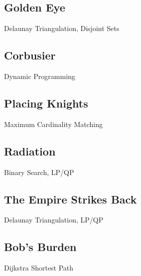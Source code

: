 \documentclass[10pt,a4paper,twoside]{report}
\begin{document}
\newpage
\subsection*{Golden Eye}
\begin{keywords}Delaunay Triangulation, Disjoint Sets\end{keywords}


\newpage
\subsection*{Corbusier}
\begin{keywords}Dynamic Programming\end{keywords}


\newpage
\subsection*{Placing Knights}
\begin{keywords}Maximum Cardinality Matching\end{keywords}


\newpage
\subsection*{Radiation}
\begin{keywords}Binary Search, LP/QP\end{keywords}


\newpage
\subsection*{The Empire Strikes Back}
\begin{keywords}\end{keywords}
\begin{keywords}Delaunay Triangulation, LP/QP\end{keywords}



\newpage
\subsection*{Bob's Burden}
\begin{keywords}Dijkstra Shortest Path\end{keywords}

\end{document}
